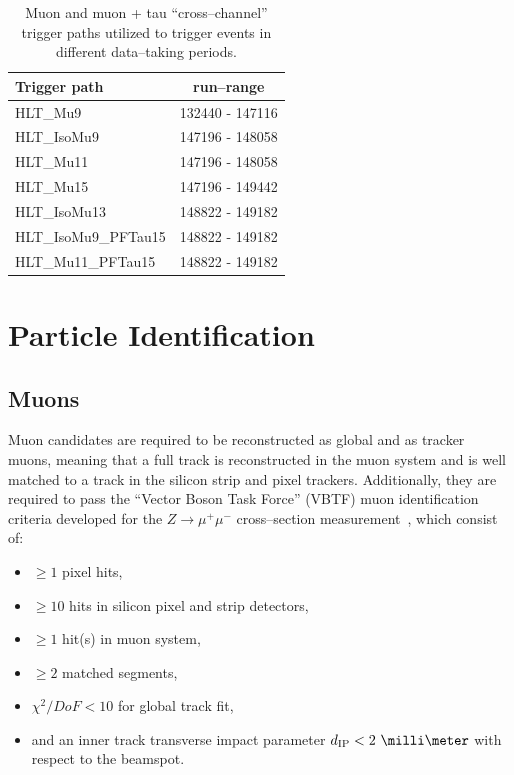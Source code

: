 \begin{table}[t]
\begin{center}

\begin{tabular}{|l|c|}
\hline
Trigger path & run--range \\
\hline
HLT\_Mu9             & 132440 - 147116 \\
HLT\_IsoMu9          & 147196 - 148058 \\
HLT\_Mu11            & 147196 - 148058 \\
HLT\_Mu15            & 147196 - 149442 \\
HLT\_IsoMu13         & 148822 - 149182 \\
HLT\_IsoMu9\_PFTau15 & 148822 - 149182 \\
HLT\_Mu11\_PFTau15   & 148822 - 149182 \\
\hline
\end{tabular}
\end{center}
\begin{center}
\caption[High Level Trigger paths used to select $\mu + \tau_h$ events]{\captiontext
Muon and muon + tau ``cross--channel'' trigger paths utilized to trigger
events in different data--taking periods.}
\label{tab:AHtoMuTauTriggers}
\end{center}
\end{table}

\section{Particle Identification}
\subsection{Muons}
\label{sec:MuonId}

Muon candidates are required to be reconstructed as global and as tracker muons,
meaning that a full track is reconstructed in the muon system and is well
matched to a track in the silicon strip and pixel trackers.
Additionally, they are required to pass the ``Vector Boson Task Force'' (VBTF)
muon identification criteria developed for the $Z \to \mu^{+} \mu^{-}$
cross--section measurement~\cite{CMS-PAS-EWK-10-002}, which consist of:
\begin{itemize}
\item $\geq 1$ pixel hits,
\item $\geq 10$ hits in silicon pixel and strip detectors,
\item $\geq 1$ hit(s) in muon system,
\item $\geq 2$ matched segments,
\item $\chi^{2}/DoF < 10$ for global track fit,
\item and an inner track transverse impact parameter $d_\text{IP} < 2~\milli\meter$
  with respect to the beamspot.
\end{itemize}

